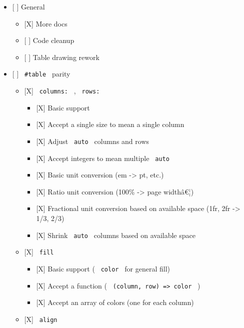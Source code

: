 \begin{itemize}
\tightlist
\item
  {[} {]} General

  \begin{itemize}
  \tightlist
  \item
    {[}X{]} More docs
  \item
    {[} {]} Code cleanup
  \item
    {[} {]} Table drawing rework
  \end{itemize}
\item
  {[} {]} \texttt{\ \#table\ } parity

  \begin{itemize}
  \tightlist
  \item
    {[}X{]} \texttt{\ columns:\ } , \texttt{\ rows:\ }

    \begin{itemize}
    \tightlist
    \item
      {[}X{]} Basic support
    \item
      {[}X{]} Accept a single size to mean a single column
    \item
      {[}X{]} Adjust \texttt{\ auto\ } columns and rows
    \item
      {[}X{]} Accept integers to mean multiple \texttt{\ auto\ }
    \item
      {[}X{]} Basic unit conversion (em -\textgreater{} pt, etc.)
    \item
      {[}X{]} Ratio unit conversion (100\% -\textgreater{} page
      widthâ€¦)
    \item
      {[}X{]} Fractional unit conversion based on available space (1fr,
      2fr -\textgreater{} 1/3, 2/3)
    \item
      {[}X{]} Shrink \texttt{\ auto\ } columns based on available space
    \end{itemize}
  \item
    {[}X{]} \texttt{\ fill\ }

    \begin{itemize}
    \tightlist
    \item
      {[}X{]} Basic support ( \texttt{\ color\ } for general fill)
    \item
      {[}X{]} Accept a function (
      \texttt{\ (column,\ row)\ =\textgreater{}\ color\ } )
    \item
      {[}X{]} Accept an array of colors (one for each column)
    \end{itemize}
  \item
    {[}X{]} \texttt{\ align\ }


\end{itemize}
\end{itemize}
